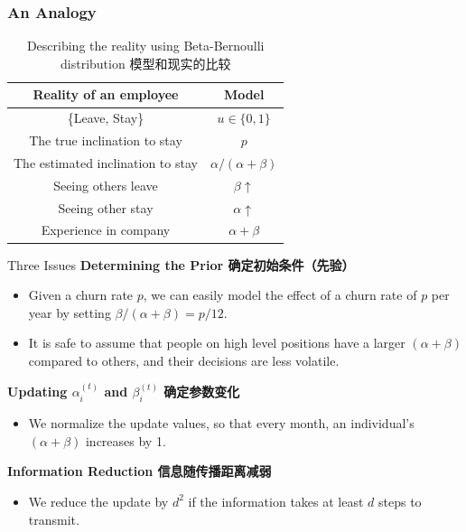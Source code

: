 \documentclass{beamer}
\begin{document}
\begin{CJK*}{UTF8}{gbsn}
\begin{frame}
\frametitle{An Analogy}
\begin{table}
\centering
\begin{tabular}{|c|c|}
\hline
Reality of an employee             &  Model \\\hline
\{Leave, Stay\}                    &  $u\in \{0, 1\}$\\
The true inclination to stay       &  $p$ \\
The estimated inclination to stay  & $\alpha/(\alpha+\beta)$ \\
Seeing others leave                & $\beta \uparrow$ \\
Seeing other stay                  & $\alpha \uparrow$ \\
Experience in company              & $\alpha + \beta$ \\
\hline
\end{tabular}
\caption{Describing the reality using Beta-Bernoulli distribution 模型和现实的比较}
\end{table}
\end{frame}

\begin{frame}{Three Issues}
\textbf{Determining the Prior 确定初始条件（先验）}
\begin{itemize}
\item Given a churn rate $p$, we can easily model the effect of a churn rate of $p$ per year by setting $\beta / (\alpha + \beta) = p / 12$.
\item It is safe to assume that people on high level positions have a larger $(\alpha+\beta)$ compared to others, and their decisions are less volatile.
\end{itemize}
 
\textbf{Updating $\alpha_i^{(t)}$ and $\beta_i^{(t)}$ 确定参数变化} 
\begin{itemize}
\item We normalize the update values, so that every month, an individual's $(\alpha+\beta)$ increases by 1.
\end{itemize}

\textbf{Information Reduction 信息随传播距离减弱} 
\begin{itemize}
\item We reduce the update by $d^2$ if the information takes at least $d$ steps to transmit.
\end{itemize}

\end{frame}


\end{CJK*}
\end{document}
